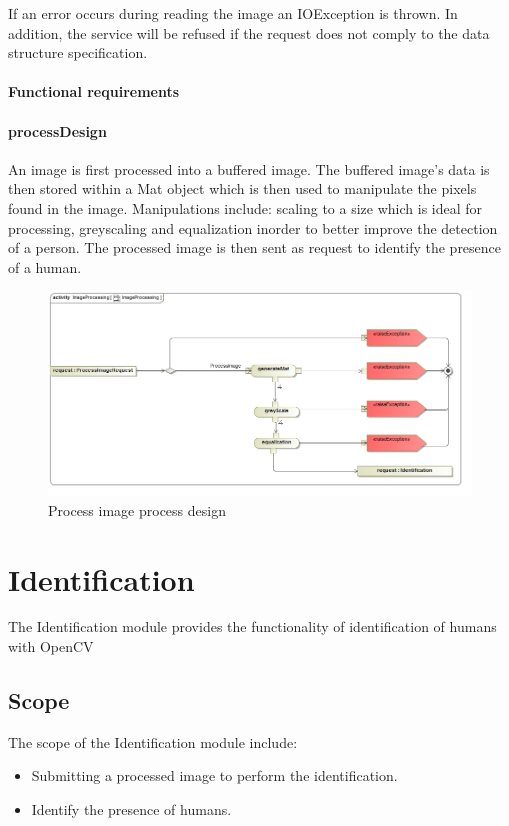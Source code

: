 \documentclass[a4paper,12pt]{report}
\begin{document}
			If an error occurs during reading the image an IOException is thrown. In addition, the service will be refused if the request does not comply to the data structure specification.
		
		\FloatBarrier
		\paragraph {Functional requirements}

		\FloatBarrier
		\paragraph {processDesign}
		An image is first processed into a buffered image. The buffered image's data is then stored within a Mat object which is then used to manipulate the pixels found in the image. Manipulations include: scaling to a size which is ideal for processing, greyscaling and equalization inorder to better improve the detection of a person. The processed image is then sent as request to identify the presence of a human.
		\begin{figure}[htb]
			\centering
			\includegraphics [scale=0.5]{../Diagrams/ImageProcessing.jpg}
			\caption{Process image process design}
		\end{figure}	

\FloatBarrier	
\section {Identification}
The Identification module provides the functionality of identification of humans with OpenCV

	\FloatBarrier	
	\subsection {Scope}
	The scope of the Identification module include:
		\begin {itemize}
			\item Submitting a processed image to perform the identification.
			\item Identify the presence of humans.
		\end {itemize}
\end{document}
